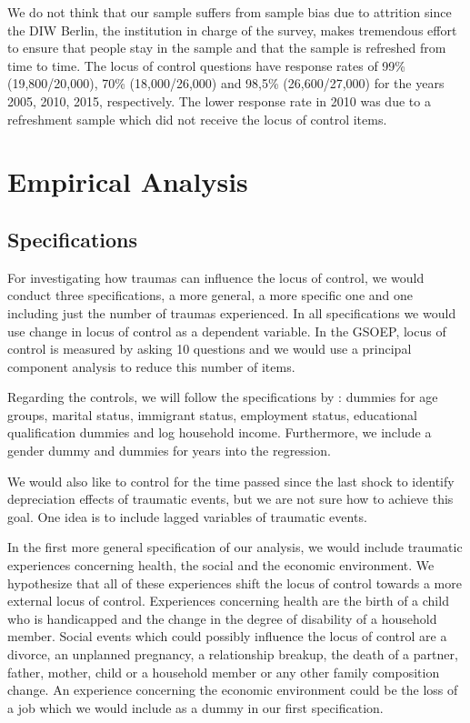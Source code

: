 \documentclass{scrartcl}
\begin{document}
We do not think that our sample suffers from sample bias due to attrition since the DIW
Berlin, the institution in charge of the survey, makes tremendous effort to ensure that
people stay in the sample and that the sample is refreshed from time to time. The locus
of control questions have response rates of 99\% (19,800/20,000), 70\% (18,000/26,000)
and 98,5\% (26,600/27,000) for the years 2005, 2010, 2015, respectively. The lower
response rate in 2010 was due to a refreshment sample which did not receive the locus of
control items.


\section{Empirical Analysis} %
\label{sec:empirical_analysis}

\subsection{Specifications} %
\label{sub:specifications}

For investigating how traumas can influence the locus of control, we would conduct three
specifications, a more general, a more specific one and one including just the number of
traumas experienced. In all specifications we would use change in locus of control as a
dependent variable. In the GSOEP, locus of control is measured by asking 10 questions
and we would use a principal component analysis to reduce this number of items.

Regarding the controls, we will follow the specifications by \citet{cobb2013}: dummies
for age groups, marital status, immigrant status, employment status, educational
qualification dummies and log household income. Furthermore, we include a gender dummy
and dummies for years into the regression.

We would also like to control for the time passed since the last shock to identify
depreciation effects of traumatic events, but we are not sure how to achieve this goal.
One idea is to include lagged variables of traumatic events.

In the first more general specification of our analysis, we would include traumatic
experiences concerning health, the social and the economic environment. We hypothesize
that all of these experiences shift the locus of control towards a more external locus
of control. Experiences concerning health are the birth of a child who is handicapped
and the change in the degree of disability of a household member. Social events which
could possibly influence the locus of control are a divorce, an unplanned pregnancy, a
relationship breakup, the death of a partner, father, mother, child or a household
member or any other family composition change. An experience concerning the economic
environment could be the loss of a job which we would include as a dummy in our first
specification.
\end{document}

